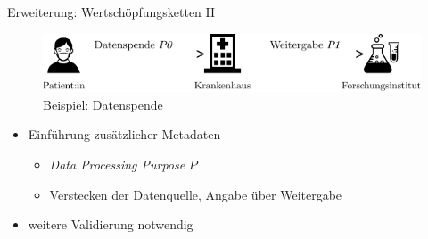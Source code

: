 \begin{frame}{Erweiterung: Wertschöpfungsketten II \footnotesize\cite{bothSolidBasedB2BData2025}}
    \addtocounter{figure}{-1}
    \begin{figure}
        \includegraphics[width=\textwidth]{./assets/example_horizontal.drawio.pdf}
        \caption{Beispiel: Datenspende}
    \end{figure}
    
    \vspace{-1em}

    \begin{itemize}
        \item Einführung zusätzlicher Metadaten
        \begin{itemize}
            \item \emph{Data Processing Purpose} $P$ %
            \item Verstecken der Datenquelle, Angabe über Weitergabe
        \end{itemize}

        \item<2-> weitere Validierung notwendig
    \end{itemize}

\end{frame}

